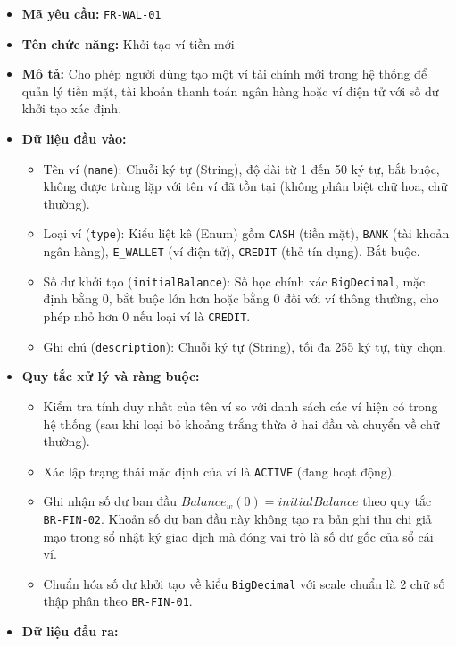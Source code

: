 \documentclass[11pt,a4paper]{article}
\providecommand{\tightlist}{
  \setlength{\itemsep}{0pt}\setlength{\parskip}{0pt}}
\begin{document}
\begin{itemize}
\tightlist
\item
  \textbf{Mã yêu cầu:} \texttt{FR-WAL-01}
\item
  \textbf{Tên chức năng:} Khởi tạo ví tiền mới
\item
  \textbf{Mô tả:} Cho phép người dùng tạo một ví tài chính mới trong hệ
  thống để quản lý tiền mặt, tài khoản thanh toán ngân hàng hoặc ví điện
  tử với số dư khởi tạo xác định.
\item
  \textbf{Dữ liệu đầu vào:}

  \begin{itemize}
  \tightlist
  \item
    Tên ví (\texttt{name}): Chuỗi ký tự (String), độ dài từ 1 đến 50 ký
    tự, bắt buộc, không được trùng lặp với tên ví đã tồn tại (không phân
    biệt chữ hoa, chữ thường).
  \item
    Loại ví (\texttt{type}): Kiểu liệt kê (Enum) gồm \texttt{CASH} (tiền
    mặt), \texttt{BANK} (tài khoản ngân hàng), \texttt{E\_WALLET} (ví
    điện tử), \texttt{CREDIT} (thẻ tín dụng). Bắt buộc.
  \item
    Số dư khởi tạo (\texttt{initialBalance}): Số học chính xác
    \texttt{BigDecimal}, mặc định bằng 0, bắt buộc lớn hơn hoặc bằng 0
    đối với ví thông thường, cho phép nhỏ hơn 0 nếu loại ví là
    \texttt{CREDIT}.
  \item
    Ghi chú (\texttt{description}): Chuỗi ký tự (String), tối đa 255 ký
    tự, tùy chọn.
  \end{itemize}
\item
  \textbf{Quy tắc xử lý và ràng buộc:}

  \begin{itemize}
  \tightlist
  \item
    Kiểm tra tính duy nhất của tên ví so với danh sách các ví hiện có
    trong hệ thống (sau khi loại bỏ khoảng trắng thừa ở hai đầu và
    chuyển về chữ thường).
  \item
    Xác lập trạng thái mặc định của ví là \texttt{ACTIVE} (đang hoạt
    động).
  \item
    Ghi nhận số dư ban đầu \(Balance_w(0) = initialBalance\) theo quy
    tắc \texttt{BR-FIN-02}. Khoản số dư ban đầu này không tạo ra bản ghi
    thu chi giả mạo trong sổ nhật ký giao dịch mà đóng vai trò là số dư
    gốc của sổ cái ví.
  \item
    Chuẩn hóa số dư khởi tạo về kiểu \texttt{BigDecimal} với scale chuẩn
    là 2 chữ số thập phân theo \texttt{BR-FIN-01}.
  \end{itemize}
\item
  \textbf{Dữ liệu đầu ra:}


\end{itemize}
\end{document}
